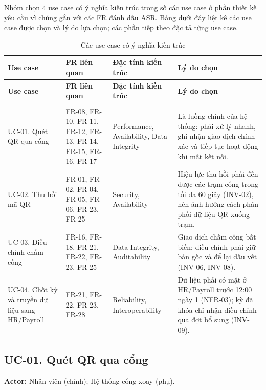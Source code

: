 Nhóm chọn 4 use case có ý nghĩa kiến trúc trong số các use case ở phần thiết kế yêu cầu vì chúng gắn với các FR đánh dấu ASR. Bảng dưới đây liệt kê các use case được chọn và lý do lựa chọn; các phần tiếp theo đặc tả từng use case.

\small
\renewcommand{\arraystretch}{1.25}
\begin{longtable}{|>{\raggedright\arraybackslash}p{2.8cm}|>{\raggedright\arraybackslash}p{3.0cm}|>{\raggedright\arraybackslash}p{3.0cm}|>{\raggedright\arraybackslash}p{5.8cm}|}
\caption{Các use case có ý nghĩa kiến trúc} \\
\hline
\textbf{Use case} & \textbf{FR liên quan} & \textbf{Đặc tính kiến trúc} & \textbf{Lý do chọn} \\
\hline
\endfirsthead
\hline
\textbf{Use case} & \textbf{FR liên quan} & \textbf{Đặc tính kiến trúc} & \textbf{Lý do chọn} \\
\hline
\endhead
\hline
\multicolumn{4}{r}{\textit{Còn tiếp sang trang sau...}} \\
\hline
\endfoot
\hline
\endlastfoot
UC-01. Quét QR qua cổng & FR-08, FR-10, FR-11, FR-12, FR-13, FR-14, FR-15, FR-16, FR-17 & Performance, Availability, Data Integrity & Là luồng chính của hệ thống: phải xử lý nhanh, ghi nhận giao dịch chính xác và tiếp tục hoạt động khi mất kết nối. \\
\hline
UC-02. Thu hồi mã QR & FR-01, FR-02, FR-04, FR-05, FR-06, FR-23, FR-25 & Security, Availability & Hiệu lực thu hồi phải đến được các trạm cổng trong tối đa 60 giây (INV-02), nên ảnh hưởng cách phân phối dữ liệu QR xuống trạm. \\
\hline
UC-03. Điều chỉnh chấm công & FR-16, FR-18, FR-21, FR-22, FR-23, FR-25 & Data Integrity, Auditability & Giao dịch chấm công bất biến; điều chỉnh phải giữ bản gốc và để lại dấu vết (INV-06, INV-08). \\
\hline
UC-04. Chốt kỳ và truyền dữ liệu sang HR/Payroll & FR-21, FR-22, FR-23, FR-28 & Reliability, Interoperability & Dữ liệu phải có mặt ở HR/Payroll trước 12:00 ngày 1 (NFR-03); kỳ đã khóa chỉ nhận điều chỉnh qua đợt bổ sung (INV-09). \\
\end{longtable}
\normalsize

\subsection{UC-01. Quét QR qua cổng}

\noindent\textbf{Actor:} Nhân viên (chính); Hệ thống cổng xoay (phụ).

